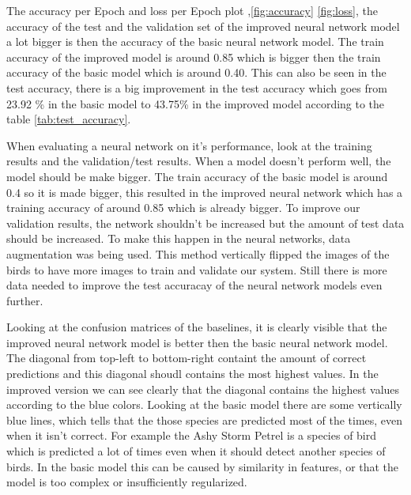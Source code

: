 The accuracy per Epoch and loss per Epoch plot ,\ref{fig:accuracy} \ref{fig:loss}, the accuracy of the test and the validation set of the improved neural network model a lot bigger is then the accuracy of the basic neural network model. The train accuracy of the improved model is around 0.85 which is bigger then the train accuracy of the basic model which is around 0.40. This can also be seen in the test accuracy, there is a big improvement in the test accuracy which goes from 23.92 \% in the basic model to 43.75\% in the improved model according to the table \ref{tab:test_accuracy}. 

When evaluating a neural network on it's performance, look at the training results and the validation/test results. When a model doesn't perform well, the model should be make bigger. The train accuracy of the basic model is around 0.4 so it is made bigger, this resulted in the improved neural network which has a training accuracy of around 0.85 which is already bigger. To improve our validation results, the network shouldn't be increased but the amount of test data should be increased. To make this happen in the neural networks, data augmentation was being used. This method vertically flipped the images of the birds to have more images to train and validate our system. Still there is more data needed to improve the test accuracay of the neural network models even further. 

Looking at the confusion matrices of the baselines, it is clearly visible that the improved neural network model is better then the basic neural network model. The diagonal from top-left to bottom-right containt the amount of correct predictions and this diagonal shoudl contains the most highest values. In the improved version we can see clearly that the diagonal contains the highest values according to the blue colors. Looking at the basic model there are some vertically blue lines, which tells that the those species are predicted most of the times, even when it isn't correct. For example the Ashy Storm Petrel is a species of bird which is predicted a lot of times even when it should detect another species of birds. In the basic model this can be caused by similarity in features, or that the model is too complex or insufficiently regularized. 

